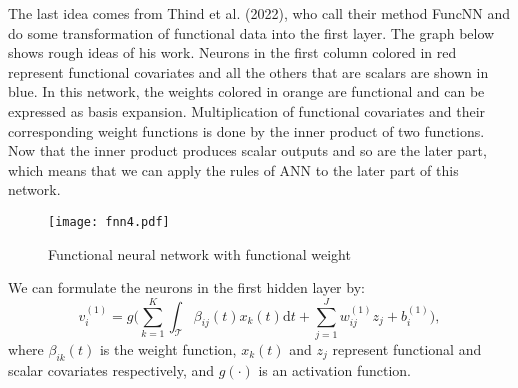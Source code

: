 The last idea comes from Thind et al. (2022), who call their method FuncNN and do some transformation of functional data into the first layer. The graph below shows rough ideas of his work. Neurons in the first column colored in red represent functional covariates and all the others that are scalars are shown in blue. In this network, the weights colored in orange are functional and can be expressed as basis expansion. Multiplication of functional covariates and their corresponding weight functions is done by the inner product of two functions. Now that the inner product produces scalar outputs and so are the later part, which means that we can apply the rules of ANN to the later part of this network.
\begin{figure}[H] %
\centering %
\texttt{[image: fnn4.pdf]} %
\caption{Functional neural network with functional weight} %
\label{fig: fnn4} %
\end{figure}
\noindent
We can formulate the neurons in the first hidden layer by:
$$
v_i^{(1)} = g\Big(\sum_{k=1}^K \int_\mathcal{T}\beta_{ij}(t)x_k(t)\mathrm{d}t + \sum_{j=1}^Jw_{ij}^{(1)}z_j + b_i^{(1)}\Big),
$$
where $\beta_{ik}(t)$ is the weight function, $x_k(t)$ and $z_j$ represent functional and scalar covariates respectively, and $g(\cdot)$ is an activation function. 

